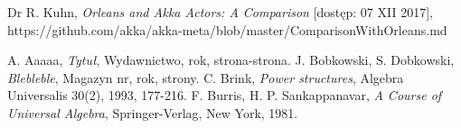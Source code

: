 \begin{thebibliography}{20}%

Dr R. Kuhn, \emph{Orleans and Akka Actors: A Comparison} [dostęp: 07 XII 2017], https://github.com/akka/akka-meta/blob/master/ComparisonWithOrleans.md

 A. Aaaaa, \emph{Tytuł}, Wydawnictwo, rok, strona-strona.
 J. Bobkowski, S. Dobkowski, \emph{Blebleble}, Magazyn nr, rok, strony.
 C. Brink, \emph{Power structures}, Algebra Universalis 30(2), 1993, 177-216.
 F. Burris, H. P. Sankappanavar, \emph{A Course of Universal Algebra}, Springer-Verlag, New York, 1981.

\end{thebibliography}